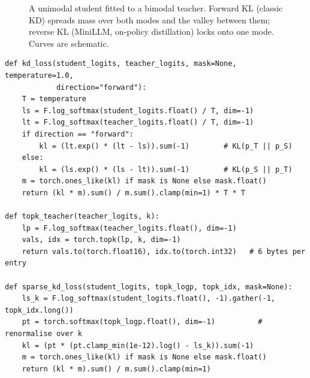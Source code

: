 \begin{figure}[t]
\centering
{}
\caption{A unimodal student fitted to a bimodal teacher. Forward KL (classic KD) spreads mass
over both modes and the valley between them; reverse KL (MiniLLM, on-policy distillation) locks
onto one mode. Curves are schematic.}
\label{fig:distill:kl}
\end{figure}

\begin{lstlisting}[caption={Token-level KD loss with temperature and direction, and a sparse
top-$k$ variant (\texttt{llmsys/distill.py}).},label={lst:distill:kd}]
def kd_loss(student_logits, teacher_logits, mask=None, temperature=1.0,
            direction="forward"):
    T = temperature
    ls = F.log_softmax(student_logits.float() / T, dim=-1)
    lt = F.log_softmax(teacher_logits.float() / T, dim=-1)
    if direction == "forward":
        kl = (lt.exp() * (lt - ls)).sum(-1)        # KL(p_T || p_S)
    else:
        kl = (ls.exp() * (ls - lt)).sum(-1)        # KL(p_S || p_T)
    m = torch.ones_like(kl) if mask is None else mask.float()
    return (kl * m).sum() / m.sum().clamp(min=1) * T * T

def topk_teacher(teacher_logits, k):
    lp = F.log_softmax(teacher_logits.float(), dim=-1)
    vals, idx = torch.topk(lp, k, dim=-1)
    return vals.to(torch.float16), idx.to(torch.int32)   # 6 bytes per entry

def sparse_kd_loss(student_logits, topk_logp, topk_idx, mask=None):
    ls_k = F.log_softmax(student_logits.float(), -1).gather(-1, topk_idx.long())
    pt = torch.softmax(topk_logp.float(), dim=-1)          # renormalise over k
    kl = (pt * (pt.clamp_min(1e-12).log() - ls_k)).sum(-1)
    m = torch.ones_like(kl) if mask is None else mask.float()
    return (kl * m).sum() / m.sum().clamp(min=1)
\end{lstlisting}

